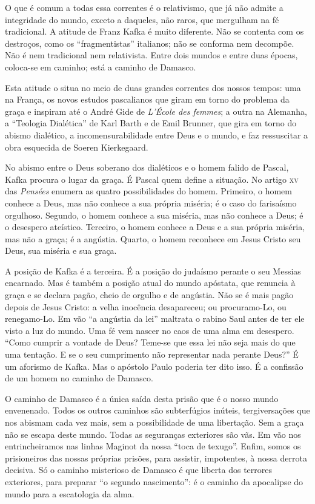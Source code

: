 O que é comum a todas
essa correntes é o relativismo, que já não admite a integridade do
mundo, exceto a daqueles, não raros, que mergulham na fé tradicional.
A atitude de Franz Kafka é muito diferente. Não se contenta com os
destroços, como os ``fragmentistas'' italianos; não se conforma nem
decompõe. Não é nem tradicional nem relativista. Entre dois mundos e
entre duas épocas, coloca-se em caminho; está a caminho de Damasco.

Esta atitude o situa no meio de duas grandes correntes dos nossos tempos: uma
na França, os novos estudos pascalianos que giram em torno do problema da
graça e inspiram até o André Gide de \textit{L'École des femmes}; a outra na
Alemanha, a ``Teologia Dialética'' de Karl Barth e de Emil Brunner,
que gira em torno do abismo dialético, a incomensurabilidade entre Deus
e o mundo, e faz ressuscitar a obra esquecida de Soeren Kierkegaard.

No abismo entre o Deus soberano dos dialéticos e o homem falido de Pascal, Kafka procura o lugar da graça. É Pascal quem define a situação. No
artigo \textsc{xv} das \textit{Pensées} enumera as quatro possibilidades do homem. Primeiro, o homem
conhece
a Deus, mas não conhece a sua própria miséria; é o caso do farisaísmo
orgulhoso. Segundo, o homem conhece a sua miséria, mas não conhece a
Deus; é o desespero ateístico. Terceiro, o homem conhece a Deus e a
sua própria miséria, mas não a graça; é a angústia. Quarto, o homem
reconhece em Jesus Cristo seu Deus, sua miséria e sua graça.

A posição de Kafka é a terceira. É a posição do judaísmo perante o seu Messias
encarnado. Mas é também a posição atual do mundo apóstata, que renuncia
à graça e se declara pagão, cheio de orgulho e de angústia. Não se é
mais pagão depois de Jesus Cristo: a velha inocência desapareceu; ou
procuramo-Lo, ou renegamo-Lo. Em vão ``a angústia da lei'' maltrata o
rabino Saul antes de ter ele visto a luz do mundo. Uma fé vem nascer no
caos de uma alma em desespero. ``Como cumprir a vontade de Deus? Teme-se
que essa lei não seja mais do que uma tentação. E se o seu cumprimento
não representar nada perante Deus?'' É um aforismo de Kafka.
Mas o apóstolo Paulo poderia ter dito isso. É a confissão de um homem no caminho de Damasco.

O caminho de Damasco é a única saída desta prisão que é o nosso mundo envenenado. Todos os outros caminhos são subterfúgios inúteis, tergiversações que nos abismam cada vez mais, sem a possibilidade de uma libertação.
Sem a graça não se escapa deste mundo. Todas as seguranças exteriores são vãs.
Em vão nos entrincheiramos nas linhas Maginot da nossa ``toca de texugo''.
Enfim, somos os prisioneiros das nossas próprias prisões, para assistir, impotentes, à
nossa derrota decisiva. Só o caminho misterioso de Damasco é que liberta dos terrores exteriores,
para preparar ``o segundo nascimento'': é o caminho da apocalipse do
mundo para a escatologia da alma.

